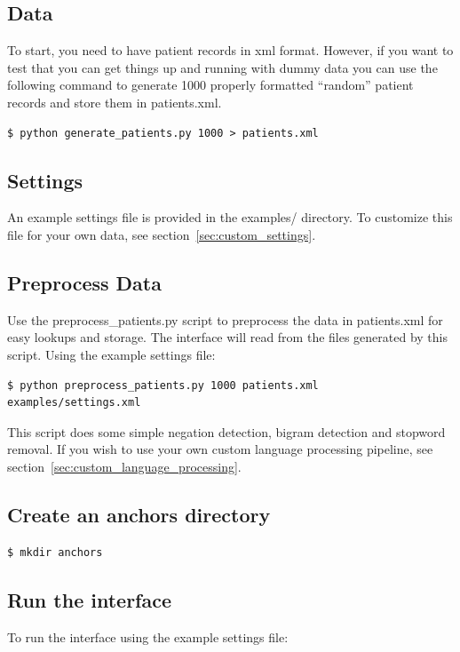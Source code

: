 \documentclass[12pt]{article}
\begin{document}
\subsection{Data}
To start, you need to have patient records in xml format. 
However, if you want to test that you can get things up and running with dummy data you can use the following command to generate 1000 properly formatted ``random'' patient records and store them in patients.xml.

\begin{verbatim}
$ python generate_patients.py 1000 > patients.xml
\end{verbatim}



\subsection{Settings}
An example settings file is provided in the examples/ directory. To customize this file for your own data, see section~\ref{sec:custom_settings}.

\subsection{Preprocess Data}

Use the preprocess\_patients.py script to preprocess the data in patients.xml for easy lookups and storage. The interface will read from the files generated by this script. Using the example settings file:

\begin{verbatim}
$ python preprocess_patients.py 1000 patients.xml examples/settings.xml
\end{verbatim}

This script does some simple negation detection, bigram detection and stopword removal.
If you wish to use your own custom language processing pipeline, see section~\ref{sec:custom_language_processing}.

\subsection{Create an anchors directory}
\begin{verbatim}
$ mkdir anchors
\end{verbatim}

\subsection{Run the interface}
To run the interface using the example settings file:
\end{document}
